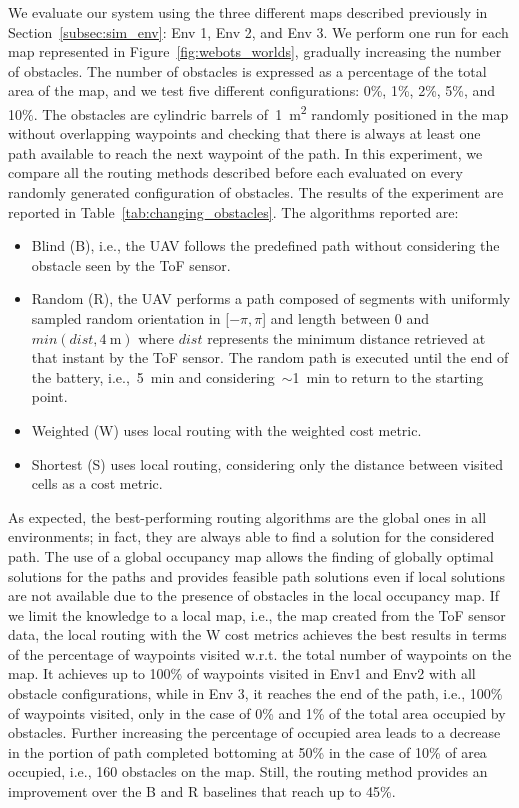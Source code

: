 We evaluate our system using the three different maps described previously in Section~\ref{subsec:sim_env}: Env 1, Env 2, and Env 3.
We perform one run for each map represented in Figure~\ref{fig:webots_worlds}, gradually increasing the number of obstacles.
The number of obstacles is expressed as a percentage of the total area of the map, and we test five different configurations: 0\%, 1\%, 2\%, 5\%, and 10\%. 
The obstacles are cylindric barrels of~\SI{1}{\meter\squared} randomly positioned in the map without overlapping waypoints and checking that there is always at least one path available to reach the next waypoint of the path.
In this experiment, we compare all the routing methods described before each evaluated on every randomly generated configuration of obstacles.
The results of the experiment are reported in Table~\ref{tab:changing_obstacles}.
The algorithms reported are:
% 
\begin{itemize}
  \item Blind (B), i.e., the UAV follows the predefined path without considering the obstacle seen by the ToF sensor. 
  \item Random (R), the UAV performs a path composed of segments with uniformly sampled random orientation in [$-\pi, \pi$] and length between 0 and $min(dist,\SI{4}{\meter})$  where $dist$ represents the minimum distance retrieved at that instant by the ToF sensor.
  The random path is executed until the end of the battery, i.e.,~\SI{5}{\minute} and considering~$\sim$\SI{1}{\minute} to return to the starting point.
  \item Weighted (W) uses local routing with the weighted cost metric.
  \item Shortest (S) uses local routing, considering only the distance between visited cells as a cost metric.
\end{itemize}

As expected, the best-performing routing algorithms are the global ones in all environments; in fact, they are always able to find a solution for the considered path. 
The use of a global occupancy map allows the finding of globally optimal solutions for the paths and provides feasible path solutions even if local solutions are not available due to the presence of obstacles in the local occupancy map.
If we limit the knowledge to a local map, i.e., the map created from the ToF sensor data, the local routing with the W cost metrics achieves the best results in terms of the percentage of waypoints visited w.r.t. the total number of waypoints on the map.
It achieves up to 100\% of waypoints visited in Env1 and Env2 with all obstacle configurations, while in Env 3, it reaches the end of the path, i.e., 100\% of waypoints visited, only in the case of 0\% and 1\% of the total area occupied by obstacles.
Further increasing the percentage of occupied area leads to a decrease in the portion of path completed bottoming at 50\% in the case of 10\% of area occupied, i.e., 160 obstacles on the map.
Still, the routing method provides an improvement over the B and R baselines that reach up to 45\%.

